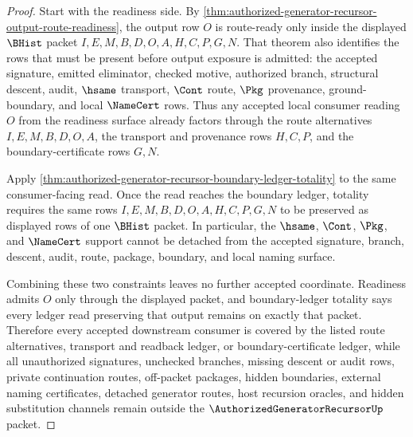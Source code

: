\begin{proof}
Start with the readiness side. By \autoref{thm:authorized-generator-recursor-output-route-readiness}, the output row $O$ is route-ready only inside the displayed $\BHist$ packet $I,E,M,B,D,O,A,H,C,P,G,N$. That theorem also identifies the rows that must be present before output exposure is admitted: the accepted signature, emitted eliminator, checked motive, authorized branch, structural descent, audit, $\hsame$ transport, $\Cont$ route, $\Pkg$ provenance, ground-boundary, and local $\NameCert$ rows. Thus any accepted local consumer reading $O$ from the readiness surface already factors through the route alternatives $I,E,M,B,D,O,A$, the transport and provenance rows $H,C,P$, and the boundary-certificate rows $G,N$.

Apply \autoref{thm:authorized-generator-recursor-boundary-ledger-totality} to the same consumer-facing read. Once the read reaches the boundary ledger, totality requires the same rows $I,E,M,B,D,O,A,H,C,P,G,N$ to be preserved as displayed rows of one $\BHist$ packet. In particular, the $\hsame$, $\Cont$, $\Pkg$, and $\NameCert$ support cannot be detached from the accepted signature, branch, descent, audit, route, package, boundary, and local naming surface.

Combining these two constraints leaves no further accepted coordinate. Readiness admits $O$ only through the displayed packet, and boundary-ledger totality says every ledger read preserving that output remains on exactly that packet. Therefore every accepted downstream consumer is covered by the listed route alternatives, transport and readback ledger, or boundary-certificate ledger, while all unauthorized signatures, unchecked branches, missing descent or audit rows, private continuation routes, off-packet packages, hidden boundaries, external naming certificates, detached generator routes, host recursion oracles, and hidden substitution channels remain outside the $\AuthorizedGeneratorRecursorUp$ packet.
\end{proof}
